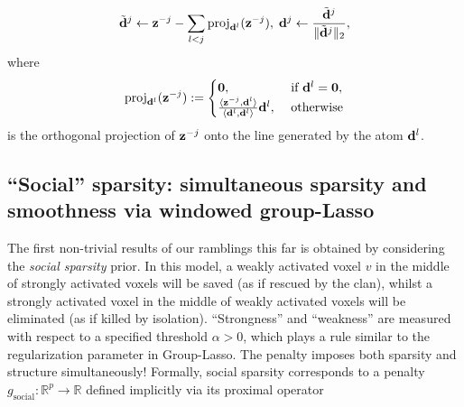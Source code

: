   \begin{eqnarray}
    \tilde{\mathbf{d}}^j \leftarrow \mathbf{z}^{-j} -\sum_{l < j}\operatorname{proj}_{\mathbf{d}^l}(\mathbf{z}^{-j}),\;\mathbf{d}^j \leftarrow \frac{\tilde{\mathbf{d}}^j}{\|\tilde{\mathbf{d}}^j\|_2},
  \end{eqnarray}
  where
  $$
  \operatorname{proj}_{\mathbf{d}^l}(\mathbf{z}^{-j}) := \begin{cases}\textbf{0},&\mbox{ if }\mathbf{d}^l = \textbf{0},\\
    \frac{\langle \mathbf{z}^{-j},\mathbf{d}^l\rangle}{\langle \mathbf{d}^l,\mathbf{d}^l\rangle}\mathbf{d}^l,&\mbox{ otherwise}
  \end{cases}
  $$
  is the orthogonal projection of $\mathbf{z}^{-j}$ onto the line generated by the atom  $\mathbf{d}^l$.
  

 \subsection{``Social'' sparsity:  simultaneous sparsity and smoothness via windowed group-Lasso}
The first non-trivial results of our ramblings this far is obtained by considering the \textit{social sparsity}  \citep{kowalski2013social,kowalski2009structured} prior. In this model, a weakly activated voxel $v$ in the middle of strongly activated voxels will be saved (as if rescued by the clan), whilst a strongly activated voxel in the middle of weakly activated voxels will be eliminated (as if killed by isolation). ``Strongness'' and ``weakness'' are measured with respect to a specified threshold $\alpha > 0$, which plays a rule similar to the regularization parameter in Group-Lasso. The penalty imposes both sparsity and structure simultaneously! Formally, social sparsity corresponds to a penalty  $g_{\text{social}} : \mathbb R^p \rightarrow \mathbb R$ defined implicitly via its proximal operator


